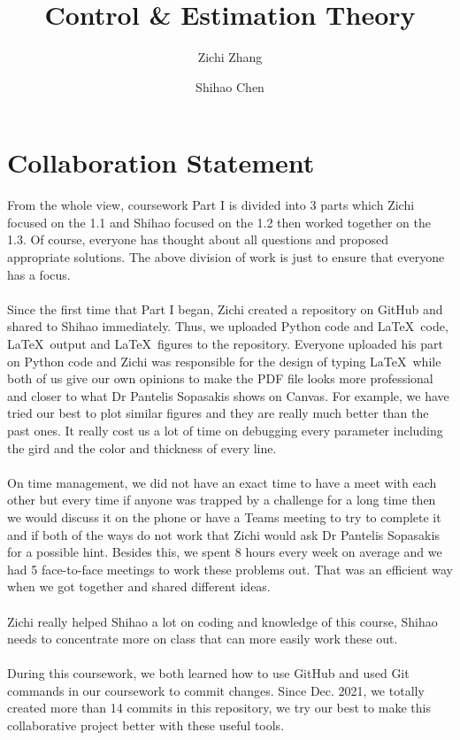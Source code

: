 \documentclass[a4paper,11pt,reqno]{amsart}
\title[ELE8088 Coursework]{Control \& Estimation Theory}
\author[Z. Zhang]{Zichi Zhang}
\author[S. Chen]{Shihao Chen}
\begin{document}
\maketitle

\vspace*{\fill}
\section*{\textbf{Collaboration Statement}}
\begin{flushleft}
    From the whole view, coursework Part I is divided into 3 parts which Zichi focused on the 1.1 and Shihao focused on the 1.2 then worked together on the 1.3.
    Of course, everyone has thought about all questions and proposed appropriate solutions. The above division of work is just to ensure that everyone has a focus.
    \\ \ \\
    Since the first time that Part I began, Zichi created a repository on GitHub and shared to Shihao immediately. Thus, we uploaded Python code and \LaTeX\ code, \LaTeX\ output and \LaTeX\ figures to the repository. Everyone uploaded his part on Python code and Zichi was responsible for the design of typing \LaTeX\ while both of us give our own opinions to make the PDF file looks more professional and closer to what Dr Pantelis Sopasakis shows on Canvas. For example, we have tried our best to plot similar figures and they are really much better than the past ones. It really cost us a lot of time on debugging every parameter including the gird and the color and thickness of every line.
    \\ \ \\
    On time management, we did not have an exact time to have a meet with each other but every time if anyone was trapped by a challenge for a long time then we would discuss it on the phone or have a Teams meeting to try to complete it and if both of the ways do not work that Zichi would ask Dr Pantelis Sopasakis for a possible hint. Besides this, we spent 8 hours every week on average and we had 5 face-to-face meetings to work these problems out. That was an efficient way when we got together and shared different ideas.
    \\ \ \\
    Zichi really helped Shihao a lot on coding and knowledge of this course, Shihao needs to concentrate more on class that can more easily work these out.
    \\ \ \\
    During this coursework, we both learned how to use GitHub and used Git commands in our coursework to commit changes. Since Dec. 2021, we totally created more than 14 commits in this repository, we try our best to make this collaborative project better with these useful tools.
\end{flushleft}
\vspace*{\fill}
\newpage
\end{document}
